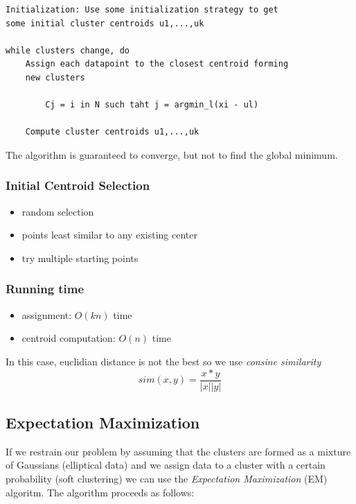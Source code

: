 \documentclass{article}
\begin{document}
\begin{verbatim}
Initialization: Use some initialization strategy to get
some initial cluster centroids u1,...,uk

while clusters change, do
    Assign each datapoint to the closest centroid forming
    new clusters

        Cj = i in N such taht j = argmin_l(xi - ul)

    Compute cluster centroids u1,...,uk
\end{verbatim}

The algorithm is guaranteed to converge, but not to find the global
minimum.

\subsubsection{Initial Centroid
Selection}\label{initial-centroid-selection}

\begin{itemize}
\tightlist
\item
  random selection
\item
  points least similar to any existing center
\item
  try multiple starting points
\end{itemize}

\subsubsection{Running time}\label{running-time}

\begin{itemize}
\tightlist
\item
  assignment: \(O(kn)\) time
\item
  centroid computation: \(O(n)\) time
\end{itemize}

In this case, euclidian distance is not the best so we use \emph{consine
similarity} \[sim(x, y)=\frac{x*y}{|x||y|}\]

\subsection{Expectation Maximization}\label{expectation-maximization}

If we restrain our problem by assuming that the clusters are formed as a
mixture of Gaussians (elliptical data) and we assign data to a cluster
with a certain probability (soft clustering) we can use the
\emph{Expectation Maximization} (EM) algoritm. The algorithm proceeds as
follows:
\end{document}
